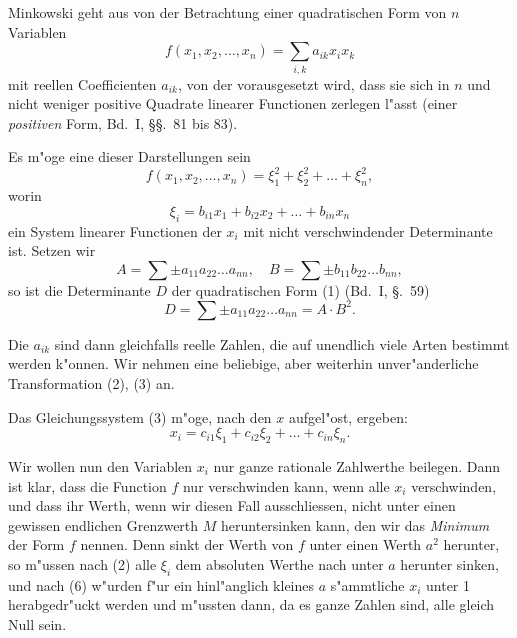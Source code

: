 \documentclass[12pt,a4paper]{article}
\theoremstyle{definition}
\begin{document}
Minkowski geht aus von der Betrachtung einer quadratischen Form von $n$ Variablen
\begin{equation}
f(x_1, x_2, \dots, x_n) = \sum_{i,k} a_{ik} x_i x_k
\end{equation}
mit reellen Coefficienten $a_{ik}$, von der vorausgesetzt wird, dass sie sich in $n$ und nicht weniger positive Quadrate linearer Functionen zerlegen l"asst (einer \emph{positiven} Form, Bd.~I, \S\S.~81 bis 83).

Es m"oge eine dieser Darstellungen sein
\begin{equation}
f(x_1, x_2, \dots, x_n) = \xi_1^2 + \xi_2^2 + \dots + \xi_n^2,
\end{equation}
worin
\begin{equation}
\xi_i = b_{i1}x_1 + b_{i2}x_2 + \dots + b_{in}x_n
\end{equation}
ein System linearer Functionen der $x_i$ mit nicht verschwindender Determinante ist. Setzen wir
\begin{equation}
A = \sum \pm a_{11}a_{22}\dots a_{nn}, \quad B = \sum \pm b_{11}b_{22}\dots b_{nn},
\end{equation}
so ist die Determinante $D$ der quadratischen Form (1) (Bd.~I, \S.~59)
\begin{equation}
D = \sum \pm a_{11}a_{22}\dots a_{nn} = A \cdot B^2.
\end{equation}

Die $a_{ik}$ sind dann gleichfalls reelle Zahlen, die auf unendlich viele Arten bestimmt werden k"onnen. Wir nehmen eine beliebige, aber weiterhin unver"anderliche Transformation (2), (3) an.

Das Gleichungssystem (3) m"oge, nach den $x$ aufgel"ost, ergeben:
\begin{equation}
x_i = c_{i1}\xi_1 + c_{i2}\xi_2 + \dots + c_{in}\xi_n.
\end{equation}

Wir wollen nun den Variablen $x_i$ nur ganze rationale Zahlwerthe beilegen. Dann ist klar, dass die Function $f$ nur verschwinden kann, wenn alle $x_i$ verschwinden, und dass ihr Werth, wenn wir diesen Fall ausschliessen, nicht unter einen gewissen endlichen Grenzwerth $M$ heruntersinken kann, den wir das \emph{Minimum} der Form $f$ nennen. Denn sinkt der Werth von $f$ unter einen Werth $a^2$ herunter, so m"ussen nach (2) alle $\xi_i$ dem absoluten Werthe nach unter $a$ herunter sinken, und nach (6) w"urden f"ur ein hinl"anglich kleines $a$ s"ammtliche $x_i$ unter 1 herabgedr"uckt werden und m"ussten dann, da es ganze Zahlen sind, alle gleich Null sein.
\end{document}
